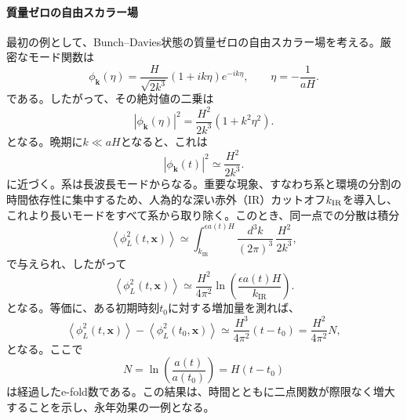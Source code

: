\documentclass[a4paper,11pt,oneside]{article}
\theoremstyle{definition}
\numberwithin{equation}{section}
\begin{document}
\paragraph{質量ゼロの自由スカラー場} 最初の例として、Bunch--Davies状態の質量ゼロの自由スカラー場を考える。厳密なモード関数は
\begin{equation}
\phi_{\mathbf{k}}(\eta)
=
\frac{H}{\sqrt{2k^{3}}}
\left(
1+ik\eta
\right)
e^{-ik\eta},
\qquad
\eta
=
-\frac{1}{aH}.
\end{equation}
である。したがって、その絶対値の二乗は
\begin{equation}
\left|
\phi_{\mathbf{k}}(\eta)
\right|^{2}
=
\frac{H^{2}}{2k^{3}}
\left(
1+k^{2}\eta^{2}
\right).
\end{equation}
となる。晩期に\(k\ll aH\)となると、これは
\begin{equation}\label{Pk}
\left|
\phi_{\mathbf{k}}(t)
\right|^{2}
\simeq
\frac{H^{2}}{2k^{3}}.
\end{equation}
に近づく。系は長波長モードからなる。重要な現象、すなわち系と環境の分割の時間依存性に集中するため、人為的な深い赤外（IR）カットオフ$ k_{\rm IR}$を導入し、これより長いモードをすべて系から取り除く。このとき、同一点での分散は積分
\begin{equation}
\left\langle
\phi_{L}^{2}(t,\mathbf{x})
\right\rangle
\simeq
\int_{k_{\mathrm{IR}}}^{\epsilon a(t)H}
\frac{d^{3}k}{(2\pi)^{3}}\,
\frac{H^{2}}{2k^{3}},
\end{equation}
で与えられ、したがって
\begin{equation}
\left\langle
\phi_{L}^{2}(t,\mathbf{x})
\right\rangle
\simeq
\frac{H^{2}}{4\pi^{2}}
\ln\left(
\frac{\epsilon a(t)H}{k_{\mathrm{IR}}}
\right).
\end{equation}
となる。等価に、ある初期時刻\(t_{0}\)に対する増加量を測れば、
\begin{equation}
\left\langle
\phi_{L}^{2}(t,\mathbf{x})
\right\rangle
-
\left\langle
\phi_{L}^{2}(t_{0},\mathbf{x})
\right\rangle
\simeq
\frac{H^{3}}{4\pi^{2}}
\left(
t-t_{0}
\right)
=
\frac{H^{2}}{4\pi^{2}}N,
\label{masslessvariancelinear}
\end{equation}
となる。ここで
\begin{equation}
N
=
\ln\left(
\frac{a(t)}{a(t_{0})}
\right)
=
H(t-t_{0})
\end{equation}
は経過したe-fold数である。この結果は、時間とともに二点関数が際限なく増大することを示し、永年効果の一例となる。
\end{document}
